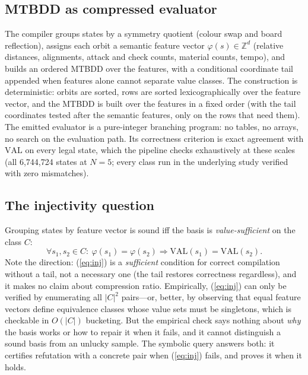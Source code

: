 \documentclass[conference]{IEEEtran}
\begin{document}
\subsection{MTBDD as compressed evaluator}
The compiler groups states by a symmetry quotient (colour swap and board
reflection), assigns each orbit a semantic feature vector
$\varphi(s) \in \mathbb{Z}^d$ (relative distances, alignments, attack and
check counts, material counts, tempo), and builds an ordered MTBDD
\cite{bryant1986,bryant1992,bahar1997,fujita1997,burch1992} over the
features, with a conditional coordinate tail appended when features alone
cannot separate value classes. The construction is deterministic: orbits
are sorted, rows are sorted lexicographically over the feature vector, and
the MTBDD is built over the features in a fixed order (with the tail
coordinates tested after the semantic features, only on the rows that
need them). The emitted evaluator is a pure-integer
branching program: no tables, no arrays, no search on the evaluation path.
Its correctness criterion is exact agreement with $\mathrm{VAL}$ on every
legal state, which the pipeline checks exhaustively at these scales (all
6{,}744{,}724 states at $N{=}5$; every class run in the underlying study
verified with zero mismatches).

\subsection{The injectivity question}
Grouping states by feature vector is sound iff the basis is
\emph{value-sufficient} on the class $C$:
\begin{equation}
\forall s_1, s_2 \in C:\ \varphi(s_1) = \varphi(s_2) \Rightarrow
\mathrm{VAL}(s_1) = \mathrm{VAL}(s_2).
\label{eq:inj}
\end{equation}
Note the direction: (\ref{eq:inj}) is a \emph{sufficient} condition for
correct compilation without a tail, not a necessary one (the tail restores
correctness regardless), and it makes no claim about compression ratio.
Empirically, (\ref{eq:inj}) can only be verified by enumerating all
$|C|^2$ pairs---or, better, by observing that equal feature vectors define
equivalence classes whose value sets must be singletons, which is
checkable in $O(|C|)$ bucketing. But the empirical check says nothing
about \emph{why} the basis works or how to repair it when it fails, and it
cannot distinguish a sound basis from an unlucky sample. The symbolic
query answers both: it certifies refutation with a concrete pair when
(\ref{eq:inj}) fails, and proves it when it holds.
\end{document}

